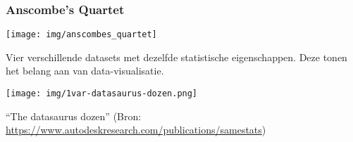 \documentclass[aspectratio=169]{beamer}
\begin{document}
\begin{frame}
  \frametitle{Anscombe's Quartet}

  \centering
  \texttt{[image: img/anscombes\_quartet]}

  Vier verschillende datasets met dezelfde statistische eigenschappen. Deze tonen het belang aan van data-visualisatie.
\end{frame}

\begin{frame}[plain]
  \centering
  
  \texttt{[image: img/1var-datasaurus-dozen.png]}
  
  ``The datasaurus dozen'' (Bron: \url{https://www.autodeskresearch.com/publications/samestats})
\end{frame}
\end{document}
